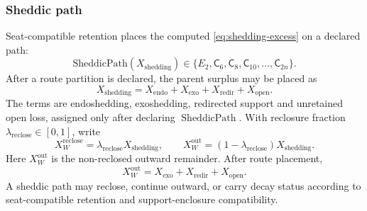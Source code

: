 \subsubsection{Sheddic path}\label{subsec:sheddic-path}
Seat-compatible retention places the computed \eqref{eq:shedding-excess} on
a declared path:
\begin{equation}
\mathrm{SheddicPath}(X_{\mathrm{shedding}})
\in
\{E_2,\mathsf C_6,\mathsf C_8,\mathsf C_{10},\ldots,\mathsf C_{2n}\}.
\label{eq:sheddic-path}
\end{equation}
After a route partition is declared, the parent surplus may be placed as
\begin{equation}
X_{\mathrm{shedding}}
=
X_{\mathrm{endo}}+X_{\mathrm{exo}}+X_{\mathrm{redir}}+X_{\mathrm{open}}.
\label{eq:shedding-route-partition}
\end{equation}
The terms are endoshedding, exoshedding, redirected support and unretained open
loss, assigned only after declaring \(\operatorname{SheddicPath}\).
With reclosure fraction \(\lambda_{\mathrm{reclose}}\in[0,1]\), write
\[
X_W^{\mathrm{reclose}}=\lambda_{\mathrm{reclose}} X_{\mathrm{shedding}},
\qquad
X_W^{\mathrm{out}}=(1-\lambda_{\mathrm{reclose}})X_{\mathrm{shedding}}.
\]
Here \(X_W^{\mathrm{out}}\) is the non-reclosed outward remainder. After route placement,
\[
X_W^{\mathrm{out}}=X_{\mathrm{exo}}+X_{\mathrm{redir}}+X_{\mathrm{open}}.
\]
A sheddic path may reclose, continue outward, or carry decay status according to seat-compatible retention and support-enclosure compatibility.


